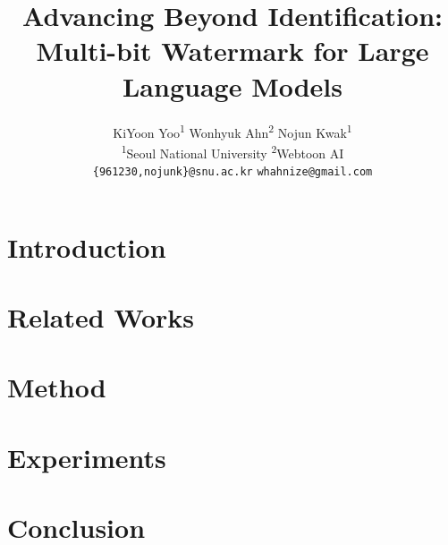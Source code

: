 \documentclass{article} %
\title{Advancing Beyond Identification: \\ Multi-bit Watermark for Large Language Models}
\author{KiYoon Yoo\textsuperscript{1}\hspace{.2cm} 
        Wonhyuk Ahn\textsuperscript{2}\hspace{.2cm}
        Nojun Kwak\textsuperscript{1}\hspace{.2cm}
        \\
\textsuperscript{1}{Seoul National University}\hspace{.2cm}
\textsuperscript{2}{Webtoon AI} \\
\texttt{\{961230,nojunk\}@snu.ac.kr} \hspace{.2cm} \texttt{whahnize@gmail.com}
}
\begin{document}
\maketitle

\begin{abstract}
    \label{sec:abstract}
    
\end{abstract}



\section{Introduction}
    \label{sec:intro}
    


\section{Related Works}
    \label{sec:related}
    



\section{Method}
    \label{sec:method}
    






\section{Experiments}
    \label{sec:exp}
    

\vspace{-3mm}
\section{Conclusion}
    \label{sec:conclusion}
    






\newpage 
\appendix

\end{document}
